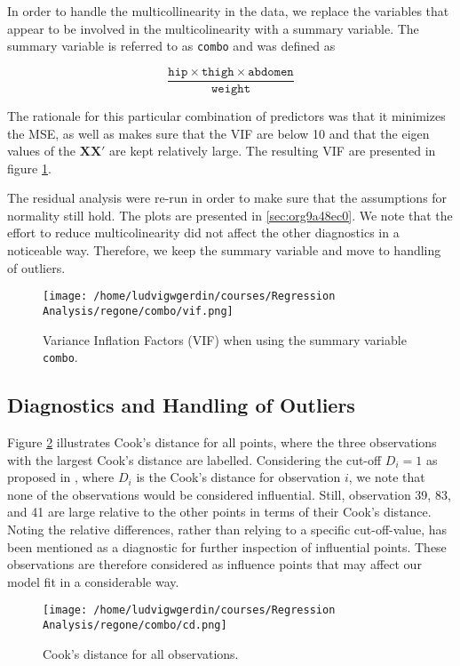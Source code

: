 \documentclass[11pt]{article}
\begin{document}
In order to handle the multicollinearity in the data, we replace the variables that appear to be involved 
in the multicolinearity with a summary variable. \cite{Montgomery2012} The summary variable is referred to as
\texttt{combo} and was defined as

\[
   \frac{\texttt{hip}\times\texttt{thigh}\times\texttt{abdomen}}{\texttt{weight}}   
   \]

The rationale for this particular combination of predictors was that it minimizes the MSE, as well as makes sure
that the VIF are below 10 and that the eigen values of the \(\textbf{X}\textbf{X}'\) are kept relatively 
large. The resulting VIF are presented in figure \ref{fig:org72cd293}. 

The residual analysis were re-run in order to make sure that the assumptions for normality still hold.
The plots are presented in \ref{sec:org9a48ec0}. We note that the effort to reduce multicolinearity did not affect the
other diagnostics in a noticeable way. Therefore, we keep the summary variable and move to handling of outliers.

\begin{figure}[htbp]
\centering
\texttt{[image: /home/ludvigwgerdin/courses/Regression Analysis/regone/combo/vif.png]}
\caption{\label{fig:org72cd293}
Variance Inflation Factors (VIF) when using the summary variable \texttt{combo}.}
\end{figure}   

\subsection{Diagnostics and Handling of Outliers}
\label{sec:orgeb1540f}

Figure \ref{fig:org121fae7} illustrates Cook's distance for all points, where the three observations with the largest 
Cook's distance are labelled. Considering the cut-off \(D_i = 1\) as proposed in \cite{Montgomery2012}, 
where \(D_i\) is the Cook's distance for observation \(i\), we note that none of the observations would be 
considered influential. Still, observation 39, 83, and 41 are large relative
to the other points in terms of their Cook's distance. Noting the relative differences, rather 
than relying to a specific cut-off-value, has been mentioned as a diagnostic for further
inspection of influential points. \cite{Fox1991} These observations are therefore considered as influence
points that may affect our model fit in a considerable way.

\begin{figure}[h]
\centering
\texttt{[image: /home/ludvigwgerdin/courses/Regression Analysis/regone/combo/cd.png]}
\caption{\label{fig:org121fae7}
Cook's distance for all observations.}
\end{figure}
\end{document}
